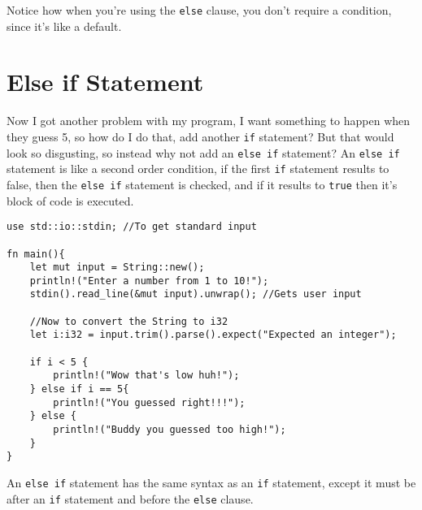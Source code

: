 \begin{remark}
Notice how when you're using the \verb!else! clause, you don't require a 
condition, since it's like a default.    
\end{remark}


\section{Else if Statement}
Now I got another problem with my program, I want something to happen when they guess 
5, so how do I do that, add another \verb!if! statement? But that would look so disgusting, 
so instead why not add an \verb!else if! statement? An \verb!else if! statement is like a second order condition, 
if the first \verb!if! statement results to false, then the \verb!else if! statement is checked, and if it results to \verb!true! then it's block of code is executed. 

\begin{lstlisting}
use std::io::stdin; //To get standard input 

fn main(){
    let mut input = String::new();
    println!("Enter a number from 1 to 10!");
    stdin().read_line(&mut input).unwrap(); //Gets user input 
    
    //Now to convert the String to i32
    let i:i32 = input.trim().parse().expect("Expected an integer");
    
    if i < 5 {
        println!("Wow that's low huh!");
    } else if i == 5{
        println!("You guessed right!!!");
    } else {
        println!("Buddy you guessed too high!");
    }
}
\end{lstlisting}

\begin{remark}
\par An \verb!else if! statement has the same syntax as an \verb!if! statement, except it must be 
after an \verb!if! statement and before the \verb!else! clause. 
\end{remark}